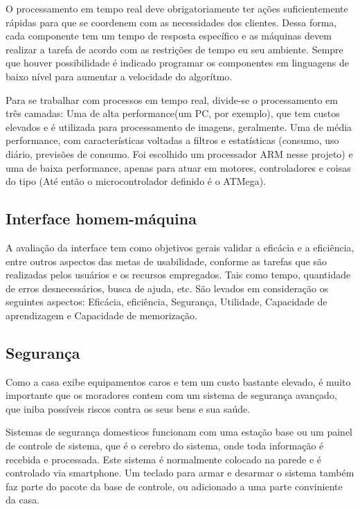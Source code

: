 	O processamento em tempo real deve obrigatoriamente ter ações suficientemente rápidas para que se coordenem com as necessidades dos clientes\cite{2014SiqueiraFraga}. Dessa forma, cada componente tem um tempo de resposta específico e as máquinas devem realizar a tarefa de acordo com as restrições de tempo eu seu ambiente\cite{brookshear2013ciencia}. Sempre que houver possibilidade é indicado programar os componentes em linguagens de baixo nível para aumentar a velocidade do algorítmo\cite{2014SiqueiraFraga2}.

	Para se trabalhar com processos em tempo real, divide-se o processamento em três camadas: Uma de alta performance(um PC, por exemplo), que tem custos elevados e é utilizada para processamento de imagens, geralmente. Uma de média performance, com características voltadas a filtros e estatísticas (consumo, uso diário, previsões de consumo. Foi escolhido um processador ARM nesse projeto) e uma de baixa performance, apenas para atuar em motores, controladores e coisas do tipo (Até então o microcontrolador definido é o ATMega).

\subsection{Interface homem-máquina}

	A avaliação da interface tem como objetivos gerais validar a eficácia e a eficiência, entre outros aspectos das metas de usabilidade, conforme as tarefas que são realizadas pelos usuários e os recursos empregados. Tais como tempo, quantidade de erros desnecessários, busca de ajuda, etc. São levados em consideração os seguintes aspectos: Eficácia, eficiência, Segurança, Utilidade, Capacidade de aprendizagem e Capacidade de memorização.

\subsection{Segurança}

	Como a casa exibe equipamentos caros e tem um custo bastante elevado, é muito importante que os moradores contem com um sistema de segurança avançado, que iniba possíveis riscos contra os seus bens e sua saúde.

	Sistemas de segurança domesticos funcionam com uma estação base ou um painel de controle de sistema, que é o cerebro do sistema, onde toda informação é recebida e processada. Este sistema é normalmente colocado na parede e é controlado via smartphone. Um teclado para armar e desarmar o sistema também faz parte do pacote da base de controle, ou adicionado a uma parte conviniente da casa.

